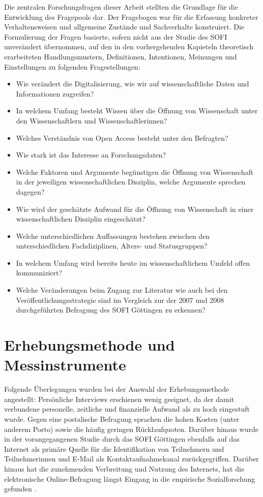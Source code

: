 Die zentralen Forschungsfragen dieser Arbeit stellten die Grundlage für die Entwicklung des Fragepools dar. Der Fragebogen war für die Erfassung konkreter Verhaltensweisen und allgemeine Zustände und Sachverhalte \cite{raab_2012_fragebogen} konstruiert. Die Formulierung der Fragen basierte, sofern nicht aus der Studie des SOFI unverändert übernommen, auf den in den vorhergehenden Kapieteln theoretisch erarbeiteten Handlungsmustern, Definitionen, Intentionen, Meinungen und Einstellungen zu folgenden Fragestellungen:
\begin{itemize}
\item Wie verändert die Digitalisierung, wie wir auf wissenschaftliche Daten und Informationen zugreifen?
\item In welchem Umfang besteht Wissen über die Öffnung von Wissenschaft unter den Wissenschaftlern und Wissenschaftlerinnen?
\item Welches Verständnis von Open Access besteht unter den Befragten?
\item Wie stark ist das Interesse an Forschungsdaten?
\item Welche Faktoren und Argumente begünstigen die Öffnung von Wissenschaft in der jeweiligen wissenschaftlichen Disziplin, welche Argumente sprechen dagegen?
\item Wie wird der geschätzte Aufwand für die Öffnung von Wissenschaft in einer wissenschaftlichen Disziplin eingeschätzt?
\item Welche unterschiedlichen Auffassungen bestehen zwischen den unterschiedlichen Fachdiziplinen, Alters- und Statusgruppen?
\item In welchem Umfang wird bereits heute im wissenschaftlichem Umfeld offen kommuniziert?
\item Welche Veränderungen beim Zugang zur Literatur wie auch bei den Veröffentlichungsstrategie sind im Vergleich zur der 2007 und 2008 durchgeführten Befragung des SOFI Göttingen zu erkennen?
\end{itemize}

\section{Erhebungsmethode und Messinstrumente}

Folgende Überlegungen wurden bei der Auswahl der Erhebungsmethode angestellt: Persönliche Interviews erschienen wenig geeignet, da der damit verbundene personelle, zeitliche und finanzielle Aufwand als zu hoch eingestuft wurde. Gegen eine postalische Befragung sprachen die hohen Kosten (unter anderem Porto) sowie die häufig geringen Rücklaufquoten. Darüber hinaus wurde in der vorangegangenen Studie durch das SOFI Göttingen ebenfalls auf das Internet als primäre Quelle für die Identifikation von Teilnehmern und Teilnehmerinnen und E-Mail als Kontaktaufnahmekanal zurückgegriffen. Darüber hinaus hat die zunehmenden Verbreitung und Nutzung des Internets, hat die elektronische Online-Befragung längst Eingang in die empirische Sozialforschung gefunden \cite{Pannewitz_2002}.

